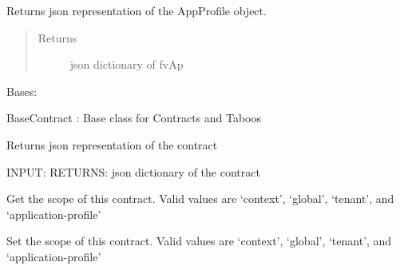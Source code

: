 \documentclass[letterpaper,10pt,english]{sphinxmanual}
\begin{document}
\begin{fulllineitems}
\begin{fulllineitems}
\end{fulllineitems}


\begin{fulllineitems}
\label{acitoolkit:acitoolkit.AppProfile.get_json}
Returns json representation of the AppProfile object.
\begin{quote}\begin{description}
\item[{Returns}] \leavevmode
json dictionary of fvAp

\end{description}\end{quote}

\end{fulllineitems}


\end{fulllineitems}


\begin{fulllineitems}
\label{acitoolkit:acitoolkit.BaseContract}
Bases: {\hyperref[acibaseobject:acibaseobject.BaseACIObject]{}}

BaseContract :  Base class for Contracts and Taboos

\begin{fulllineitems}
\label{acitoolkit:acitoolkit.BaseContract.get_json}
Returns json representation of the contract

INPUT:
RETURNS: json dictionary of the contract

\end{fulllineitems}


\begin{fulllineitems}
\label{acitoolkit:acitoolkit.BaseContract.get_scope}
Get the scope of this contract.
Valid values are `context', `global', `tenant', and
`application-profile'

\end{fulllineitems}


\begin{fulllineitems}
\label{acitoolkit:acitoolkit.BaseContract.set_scope}
Set the scope of this contract.
Valid values are `context', `global', `tenant', and
`application-profile'

\end{fulllineitems}


\end{fulllineitems}
\end{document}
